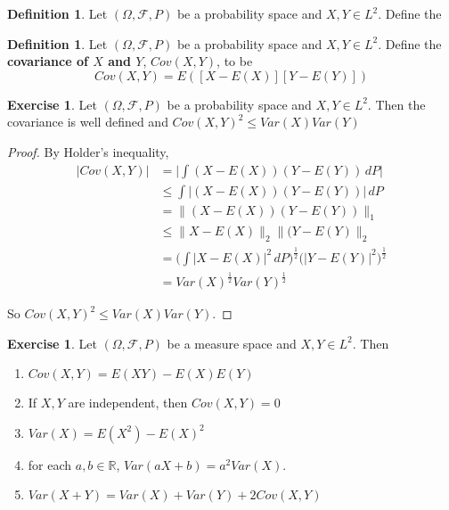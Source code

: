 \documentclass[12pt]{amsart}
\theoremstyle{definition}
\newtheorem{defn}[definition]{Definition}
\newtheorem{ex}[definition]{Exercise}
\newcommand{\Om}{\Omega}
\newcommand{\R}{\mathbb{R}}
\newcommand{\MF}{\mathcal{F}}
\newcommand{\dP}{\, d P}
\begin{document}
	\begin{defn}
		Let $(\Om, \MF, P)$ be a probability space and $X,Y \in L^2$. Define the  
	\end{defn}
	
	
	\begin{defn}
		Let $(\Om, \MF, P)$ be a probability space and $X,Y \in L^2$. Define the \textbf{covariance of $X$ and $Y$}, $Cov(X,Y)$, to be $$Cov(X,Y) = E([X-E(X)][Y-E(Y)])$$
	\end{defn}
	
	\begin{ex}
		Let $(\Om, \MF, P)$ be a probability space and $X,Y \in L^2$. Then the covariance is well defined and $Cov(X,Y) ^2 \leq Var(X)Var(Y)$
		
		\begin{proof}
			By Holder's inequality, 
			\begin{align*}
				| Cov(X,Y) |
				&= \bigg | \int (X-E(X))(Y-E(Y)) \dP \bigg | \\
				&\leq \int | (X-E(X))(Y-E(Y)) | \dP \\
				&= \|(X-E(X))(Y-E(Y)) \|_1 \\
				&\leq \|X-E(X) \|_2 \|(Y-E(Y) \|_2  \\
				&= \bigg(\int | X - E(X) |^2 \dP\bigg)^{\frac{1}{2}} \bigg( | Y - E(Y) |^2 \bigg)^{\frac{1}{2}} \\
				&= Var(X)^{\frac{1}{2}}Var(Y)^{\frac{1}{2}}
			\end{align*}
			
			So $Cov(X,Y) ^2 \leq Var(X)Var(Y)$.
		\end{proof}
		
	\end{ex}
	
	\begin{ex}
		Let $(\Om, \MF, P)$ be a measure space and $X,Y \in L^2$. Then
		\begin{enumerate}
			\item $Cov(X,Y) = E(XY)-E(X)E(Y)$
			\item If $X,Y$ are independent, then $Cov(X,Y) = 0$
			\item $Var(X) = E(X^2) - E(X)^2$
			\item for each $a,b \in \R$, $Var(aX + b) = a^2Var(X)$.
			\item $Var(X+Y) = Var(X) + Var(Y) + 2 Cov(X,Y)$
		\end{enumerate}
	\end{ex}
	
\end{document}
